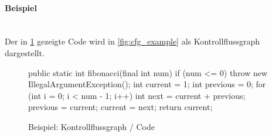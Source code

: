 \documentclass[
    ngerman,
    color=3b,
    summary,
    boxarc,
    main,
]{rubos-tuda-template}
\begin{document}
\paragraph{Beispiel}\mbox{}\\
Der in \figurename{} \ref{fig:fibonaccicodecfg} gezeigte Code wird in \figurename{} \ref{fig:cfg_example} als Kontrollflussgraph dargestellt.
\begin{figure}[ht]
    \centering
    \begin{codeBlock}[autogobble]{}
        public static int fibonacci(final int num) {
        	if (num <= 0) {
        		throw new IllegalArgumentException();
        	}
        	int current = 1;
        	int previous = 0;
        	for (int i = 0; i < num - 1; i++) {
        		int next = current + previous;
        		previous = current;
        		current = next;
        	}
        	return current;
        }
	\end{codeBlock}
    \caption{Beispiel: Kontrollflussgraph / Code}
    \label{fig:fibonaccicodecfg}
\end{figure}
\end{document}
